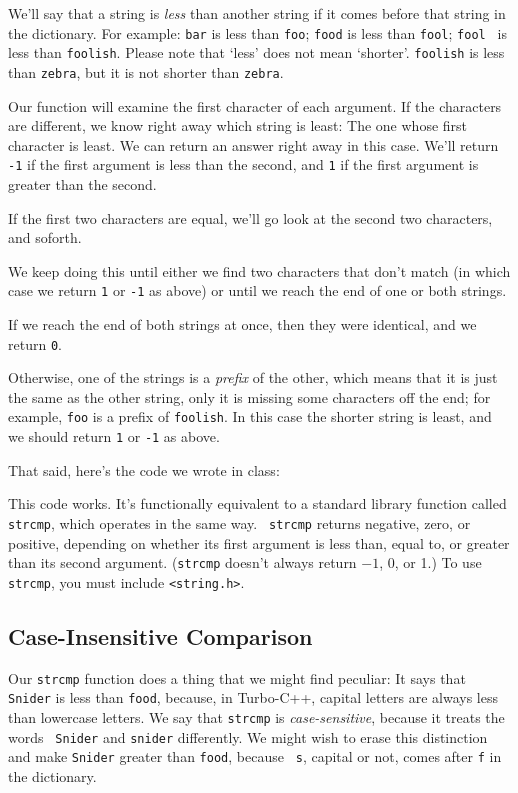     We'll say that a string is {\em less}\/ than another string if it
comes before that string in the dictionary.  For example: {\tt bar} is
less than {\tt foo}; {\tt food} is less than {\tt fool}; {\tt fool } is
less than {\tt foolish}.  Please note that `less' does not mean
`shorter'.  {\tt foolish} is less than {\tt zebra}, but it is not
shorter than {\tt zebra}.

    Our function will examine the first character of each argument.  If
the characters are different, we know right away which string is least:
The one whose first character is least.  We can return an answer right
away in this case.  We'll return {\tt -1} if the first argument is less
than the second, and {\tt 1} if the first argument is greater than the
second.

    If the first two characters are equal, we'll go look at the second
two characters, and soforth.

    We keep doing this until either we find two characters that don't
match (in which case we return {\tt 1} or {\tt -1} as above) or until we
reach the end of one or both strings.

    If we reach the end of both strings at once, then they were
identical, and we return {\tt 0}. 

    Otherwise, one of the strings is a {\em prefix}\/ of the other,
which means that it is just the same as the other string, only it is
missing some characters off the end; for example, {\tt foo} is a prefix
of {\tt foolish}.  In this case the shorter string is least, and we
should return {\tt 1} or {\tt -1} as above.

That said, here's the code we wrote in class:



This code works.  It's functionally equivalent to a standard library
function called {\tt strcmp}, which operates in the same way.  {\tt
strcmp} returns negative, zero, or positive, depending on whether its
first argument is less than, equal to, or greater than its second
argument.  ({\tt strcmp} doesn't always return $-1$, 0, or 1.)  To use
{\tt strcmp}, you must include {\tt <string.h>}.

\subsection{Case-Insensitive Comparison}

Our {\tt strcmp} function does a thing that we might find peculiar: It
says that {\tt Snider} is less than {\tt food}, because, in Turbo-C++,
capital letters are always less than lowercase letters.  We say that
{\tt strcmp} is {\em case-sensitive}\/, because it treats the words {\tt
Snider} and {\tt snider} differently.  We might wish to erase this
distinction and make {\tt Snider} greater than {\tt food}, because {\tt
s}, capital or not, comes after {\tt f} in the dictionary.

